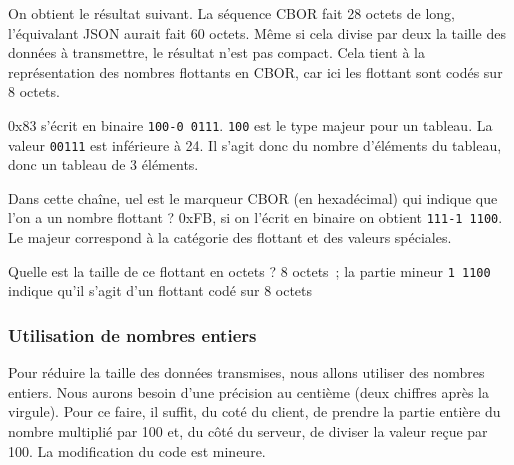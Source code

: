 
On obtient le résultat suivant. La séquence CBOR fait 28 octets de long, l'équivalant JSON aurait fait 60 octets. Même si cela divise par deux la taille des données à transmettre, le résultat n'est pas compact. Cela tient à la représentation des nombres flottants en CBOR, car ici les flottant sont codés sur 8 octets.

 {
 0x83 s'écrit en binaire \texttt{100-0 0111}. \texttt{100} est le type majeur pour un tableau. La valeur \texttt{00111} est inférieure à 24. Il s'agit donc du nombre d'éléments du tableau, donc un tableau de 3 éléments.
 }

{Dans cette chaîne, uel est le marqueur CBOR (en hexadécimal) qui indique que l’on a un nombre flottant ?}
{0xFB, si on l'écrit en binaire on obtient \texttt{111-1 1100}. Le majeur correspond à la catégorie des flottant et des valeurs spéciales.}

{Quelle est la taille de ce flottant en octets ?}
{8 octets~; la partie mineur \texttt{1 1100} indique qu'il s'agit d'un flottant codé sur 8 octets}

\subsubsection{Utilisation de nombres entiers}

Pour réduire la taille des données transmises, nous allons utiliser des nombres entiers. Nous aurons besoin d’une précision au centième (deux chiffres après la virgule). Pour ce faire, il suffit, du coté du client, de prendre la partie entière du nombre multiplié par 100 et, du côté du serveur, de diviser la valeur reçue par 100. La modification du code est mineure.

